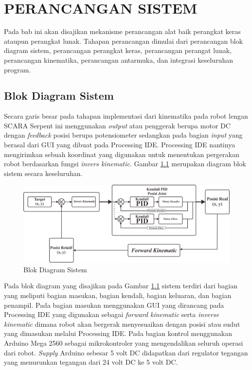 
\chapter{PERANCANGAN SISTEM}
Pada bab ini akan disajikan mekanisme perancangan alat baik perangkat keras ataupun perangkat lunak. Tahapan perancangan dimulai dari perancangan blok diagram sistem, perancangan perangkat keras, perancangan perangat lunak, perancangan kinematika, perancangan antarmuka, dan integrasi keseluruhan program. 
\section{ Blok Diagram Sistem }
Secara garis besar pada tahapan implementasi dari kinematika pada robot lengan SCARA Serpent ini menggunakan \textit{output} atau penggerak berupa motor DC dengan \textit{feedback} posisi berupa potensiometer sedangkan pada bagian  \textit{input} yang berasal dari GUI yang dibuat pada Processing IDE. Processing IDE nantinya mengirimkan sebuah koordinat yang digunakan untuk menentukan pergerakan robot berdasarkan fungsi \textit{invers kinematic}. Gambar \ref{pic.diagram.bloksistem} merupakan diagram blok sistem secara keseluruhan.
\begin{figure}[H]
	\centering
	\includegraphics[width=13cm]{gambar/diagram_blok_new.png}
	\caption{Blok Diagram Sistem}
	\label{pic.diagram.bloksistem}
\end{figure}
Pada blok diagram yang disajikan pada Gambar \ref{pic.diagram.bloksistem} sistem terdiri dari bagian yang meliputi bagian masukan, bagian kendali, bagian keluaran, dan bagian penampil. Pada bagian masukan menggunakan GUI yang dirancang pada Processing IDE yang digunakan sebagai \textit{forward kinematic} serta \textit{inverse kinematic} dimana robot akan bergerak menyesuaikan dengan posisi atau sudut yang dimasukan melalui Processing IDE. 
Pada bagian kontrol menggunakan Arduino Mega 2560 sebagai mikrokontroler yang mengendalikan seluruh operasi dari robot. \textit{Supply} Arduino sebesar 5 volt DC didapatkan dari regulator tegangan yang menurunkan tegangan dari 24 volt DC ke 5 volt DC. 

